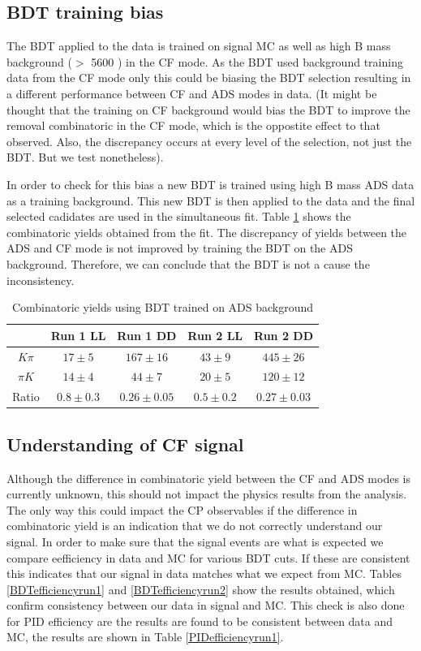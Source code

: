 \subsection{BDT training bias}

The BDT applied to the data is trained on signal MC as well as high B mass background ($>$ 5600 \mev) in the CF mode. As the BDT used background training data from the CF mode only this could be biasing the BDT selection resulting in a different performance between CF and ADS modes in data. (It might be thought that the training on CF background would bias the BDT to improve the removal combinatoric in the CF mode, which is the oppostite effect to that observed. Also, the discrepancy occurs at every level of the selection, not just the BDT. But we test nonetheless).

In order to check for this bias a new BDT is trained using high B mass ADS data as a training background. This new BDT is then applied to the data and the final selected cadidates are used in the simultaneous fit. Table \ref{adsbdt} shows the combinatoric yields obtained from the fit. The discrepancy of yields between the ADS and CF mode is not improved by training the BDT on the ADS background. Therefore, we can conclude that the BDT is not a cause the inconsistency.

\begin{table}[!h]
\centering
\begin{tabular}{c|cccc}
& Run 1 LL & Run 1 DD & Run 2 LL & Run 2 DD \\
\hline
$K\pi$ & $17 \pm 5$ & $167 \pm 16$ & $43 \pm 9$ & $445 \pm 26$ \\
$\pi K$ & $14 \pm 4$ & $44 \pm 7$ & $20 \pm 5$ & $120 \pm 12$ \\
\hline
Ratio & $0.8 \pm 0.3$ & $0.26 \pm 0.05$ & $0.5 \pm 0.2$ & $0.27 \pm 0.03$ \\
\hline
\end{tabular}
\caption{Combinatoric yields using BDT trained on ADS background}
\label{adsbdt}
\end{table}

\subsection{Understanding of CF signal}

Although the difference in combinatoric yield between the CF and ADS modes is currently unknown, this should not impact the physics results from the analysis. The only way this could impact the CP observables if the difference in combinatoric yield is an indication that we do not correctly understand our signal. In order to make sure that the signal events are what is expected we compare eefficiency in data and MC for various BDT cuts. If these are consistent this indicates that our signal in data matches what we expect from MC. Tables \ref{BDTefficiencyrun1} and \ref{BDTefficiencyrun2} show the results obtained, which confirm consistency between our data in signal and MC. This check is also done for PID efficiency are the results are found to be consistent between data and MC, the results are shown in Table \ref{PIDefficiencyrun1}.

